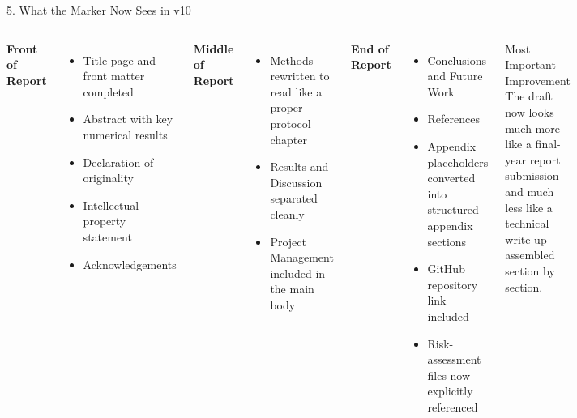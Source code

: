 \documentclass[aspectratio=169, 11pt]{beamer}
\begin{document}
\begin{frame}[shrink=5]{5. What the Marker Now Sees in v10}

    \begin{columns}[T]
        \textbf{Front of Report}
        \begin{itemize}
            \item Title page and front matter completed
            \item Abstract with key numerical results
            \item Declaration of originality
            \item Intellectual property statement
            \item Acknowledgements
        \end{itemize}

        \vspace{2mm}
        \textbf{Middle of Report}
        \begin{itemize}
            \item Methods rewritten to read like a proper protocol chapter
            \item Results and Discussion separated cleanly
            \item Project Management included in the main body
        \end{itemize}

        \textbf{End of Report}
        \begin{itemize}
            \item Conclusions and Future Work
            \item References
            \item Appendix placeholders converted into structured appendix sections
            \item GitHub repository link included
            \item Risk-assessment files now explicitly referenced
        \end{itemize}

        \vspace{2mm}
        \begin{alertblock}{Most Important Improvement}
            The draft now looks much more like a final-year report submission and much less like a technical write-up assembled section by section.
        \end{alertblock}
    \end{columns}
\end{frame}
\end{document}
